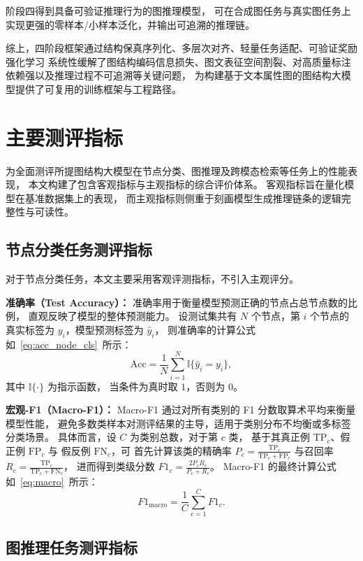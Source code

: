 阶段四得到具备可验证推理行为的图推理模型，
可在合成图任务与真实图任务上实现更强的零样本/小样本泛化，并输出可追溯的推理链。

综上，四阶段框架通过结构保真序列化、多层次对齐、轻量任务适配、可验证奖励强化学习
系统性缓解了图结构编码信息损失、图文表征空间割裂、对高质量标注依赖强以及推理过程不可追溯等关键问题，
为构建基于文本属性图的图结构大模型提供了可复用的训练框架与工程路径。

\section{主要测评指标}

为全面测评所提图结构大模型在节点分类、图推理及跨模态检索等任务上的性能表现，
本文构建了包含客观指标与主观指标的综合评价体系。
客观指标旨在量化模型在基准数据集上的表现，
而主观指标则侧重于刻画模型生成推理链条的逻辑完整性与可读性。
\subsection{节点分类任务测评指标}
对于节点分类任务，本文主要采用客观评测指标，不引入主观评分。

\textbf{准确率（Test Accuracy）：}
准确率用于衡量模型预测正确的节点占总节点数的比例，
直观反映了模型的整体预测能力。
设测试集共有 $N$ 个节点，第 $i$ 个节点的真实标签为 $y_i$，模型预测标签为 $\hat{y}_i$，
则准确率的计算公式如~\ref{eq:acc_node_cls}\ 所示：
\begin{equation}
\mathrm{Acc} = \frac{1}{N} \sum_{i=1}^{N} \mathbb{I}\{\hat{y}_i = y_i\},
\label{eq:acc_node_cls}
\end{equation}
其中 $\mathbb{I}\{\cdot\}$ 为指示函数，
当条件为真时取 $1$，否则为 $0$。

\textbf{宏观-F1（Macro-F1）：}
Macro-F1 通过对所有类别的
F1 分数取算术平均来衡量模型性能，
避免多数类样本对测评结果的主导，适用于类别分布不均衡或多标签分类场景。
具体而言，设 $C$ 为类别总数，对于第 $c$ 类，
基于其真正例 $\mathrm{TP}_c$、假正例 $\mathrm{FP}_c$ 与
假反例 $\mathrm{FN}_c$，可
首先计算该类的精确率 $P_c = \frac{\mathrm{TP}_c}{\mathrm{TP}_c + \mathrm{FP}_c}$ 
与召回率 $R_c = \frac{\mathrm{TP}_c}{\mathrm{TP}_c + \mathrm{FN}_c}$，
进而得到类级分数 $F1_c = \frac{2 P_c R_c}{P_c + R_c}$。
Macro-F1 的最终计算公式如~\ref{eq:macro}\ 所示：
\begin{equation}
F1_{\text{macro}}=\frac{1}{C}\sum_{c=1}^{C} F1_c.
\label{eq:macro}
\end{equation}

\subsection{图推理任务测评指标}
